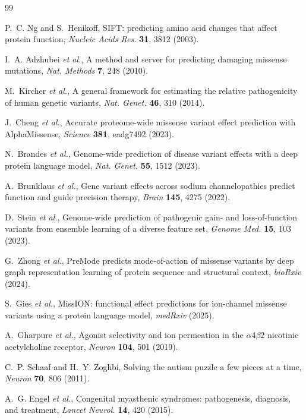 \documentclass{ws-procs11x85}
\begin{document}
\begin{thebibliography}{99}

P.~C. Ng and S.~Henikoff,
SIFT: predicting amino acid changes that affect protein function,
{\em Nucleic Acids Res.} {\bf 31}, 3812 (2003).

I.~A. Adzhubei {\em et al.},
A method and server for predicting damaging missense mutations,
{\em Nat. Methods} {\bf 7}, 248 (2010).

M.~Kircher {\em et al.},
A general framework for estimating the relative pathogenicity of human
genetic variants,
{\em Nat. Genet.} {\bf 46}, 310 (2014).

J.~Cheng {\em et al.},
Accurate proteome-wide missense variant effect prediction with
AlphaMissense,
{\em Science} {\bf 381}, eadg7492 (2023).

N.~Brandes {\em et al.},
Genome-wide prediction of disease variant effects with a deep protein
language model,
{\em Nat. Genet.} {\bf 55}, 1512 (2023).

A.~Brunklaus {\em et al.},
Gene variant effects across sodium channelopathies predict function and
guide precision therapy,
{\em Brain} {\bf 145}, 4275 (2022).

D.~Stein {\em et al.},
Genome-wide prediction of pathogenic gain- and loss-of-function variants
from ensemble learning of a diverse feature set,
{\em Genome Med.} {\bf 15}, 103 (2023).

G.~Zhong {\em et al.},
PreMode predicts mode-of-action of missense variants by deep graph
representation learning of protein sequence and structural context,
{\em bioRxiv} (2024).

S.~Gies {\em et al.},
MissION: functional effect predictions for ion-channel missense variants
using a protein language model,
{\em medRxiv} (2025).

A.~Gharpure {\em et al.},
Agonist selectivity and ion permeation in the $\alpha$4$\beta$2 nicotinic
acetylcholine receptor,
{\em Neuron} {\bf 104}, 501 (2019).

C.~P. Schaaf and H.~Y. Zoghbi,
Solving the autism puzzle a few pieces at a time,
{\em Neuron} {\bf 70}, 806 (2011).

A.~G. Engel {\em et al.},
Congenital myasthenic syndromes: pathogenesis, diagnosis, and treatment,
{\em Lancet Neurol.} {\bf 14}, 420 (2015).


\end{thebibliography}
\end{document}
